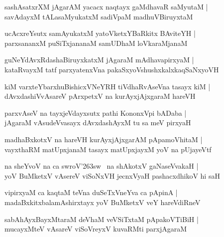 \documentclass[twoside,12pt,openright]{book}
\def\S{\char'263}
\newcounter{shloka}[chapter]
\begin{document}
\begin{shloka}%
sashAsatxrXM jAgarAM yacacx naqtayx gaMdhavaR saMyutaM |\\
savAdayxM tALasaMyukatxM sadiVpaM madhuVBiruyxtaM 
\end{shloka}

\begin{shloka}%
ucAcxreYsutx samAyukatxM yatoVketxYBaRkitx BAviteYH |\\
parxsananxM puSiTxjananaM samUDhaM loVkaraMjanaM 
\end{shloka}

\begin{shloka}%
guNeYdAvxRdashaBiruyxkatxM jAgaraM mAdhavapirxyaM |\\
kataRvayxM tatf parxyatenxVna pakaSxyoVshushxkalxkaqSaNxyoVH
\end{shloka}

\begin{shloka}%
kiM varxteYbarxhuBishicxVNeYRH tiVdhaRvAseVna tasayx kiM |\\
dAvxdashiVvAsareV pArxpetxV na kurAyxjAjxgaraM hareVH 
\end{shloka}

\begin{shloka}%
parxvAseV na tayxjeVdayxsutx pathi KononxVpi bADaba |\\
jAgaraM vAsudeVvasayx dAvxdashAyxM tu sa meV pirxyaH 
\end{shloka}

\begin{shloka}%
madhaBxkotxV na hareVH kurAyxjAjxgarAM pApamoVhitaM |\\
vayxthaRM matUpxjanaM tasayx matUpxjayxM yoV na pUjayeVtf
\end{shloka}

\begin{shloka}%
na sheYvoV na ca swroV\S sw ~na shAkotxV gaNaseVvakaH |\\
yoV BuMketxV vAsereV viSoNxVH jecnxVyaH pashacxdhikoV hi saH 
\end{shloka}

\begin{shloka}%
vipirxyaM ca kaqtaM teVna duSeTxVneYva ca pApinA |\\
madaBxkitxbalamAshirxtayx yoV BuMketxV veY hareVdiRneV 
\end{shloka}

\begin{shloka}%
sabAhAyxBayxMtaraM deVhaM veVSiTxtaM pApakoVTiBiH |\\
mucayxMteV vAsareV viSoVreyxV kuvaRMti parxjAgaraM
\end{shloka}
\end{document}
